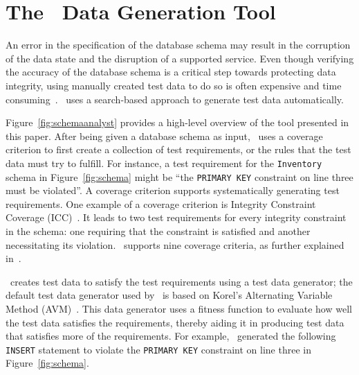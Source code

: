 \section{The \sa~Data Generation Tool}\label{sec:technique}


An error in the specification of the database schema may result in the corruption of the data state and the disruption
of a supported service.  Even though verifying the accuracy of the database schema is a critical step towards protecting
data integrity, using manually created test data to do so is often expensive and time
consuming~\cite{kapfhammer2013search}.  \sa~uses a search-based approach to generate test data automatically.


Figure~\ref{fig:schemaanalyst} provides a high-level overview of the tool presented in this paper.  After being given a
database schema as input, \sa~uses a coverage criterion to first create a collection of test requirements, or the
rules that the test data must try to fulfill.  For instance, a test requirement for the \texttt{Inventory} schema in
Figure~\ref{fig:schema} might be ``the \texttt{PRIMARY KEY} constraint on line three must be violated''. A coverage
criterion supports systematically generating test requirements.  One example of a coverage criterion is Integrity
Constraint Coverage (ICC)~\cite{mcminn2015effectiveness}. It leads to two test requirements for every integrity
constraint in the schema: one requiring that the constraint is satisfied and another necessitating its violation.
\sa~supports nine coverage criteria, as further explained in~\cite{mcminn2015effectiveness}.


\sa~creates test data to satisfy the test requirements using a test data generator; the default test data generator used
by \sa~is based on Korel's Alternating Variable Method (AVM)~\cite{Korel:AVM}. This data generator uses a fitness
function to evaluate how well the test data satisfies the requirements, thereby aiding it in producing test data that
satisfies more of the requirements. For example, \sa~generated the following \texttt{INSERT} statement to violate the
\texttt{PRIMARY KEY} constraint on line three in Figure~\ref{fig:schema}.

